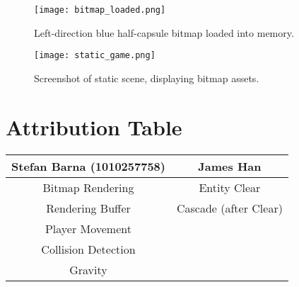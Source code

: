 \documentclass{article}
\begin{document}
\begin{figure}
    \centering
    \texttt{[image: bitmap\_loaded.png]}
    \caption{Left-direction blue half-capsule bitmap loaded into memory.}
    \label{fig:bitmap-loaded}
\end{figure}

\begin{figure}[ht!]
    \centering
    \texttt{[image: static\_game.png]}
    \caption{Screenshot of static scene, displaying bitmap assets.}
    \label{fig:static-game}
\end{figure}

\section{Attribution Table}
\begin{center}
\begin{tabular}{|| c | c ||}
\hline
Stefan Barna (1010257758) & James Han \\
\hline
\hline
Bitmap Rendering & Entity Clear \\
\hline
Rendering Buffer & Cascade (after Clear) \\
\hline
Player Movement & \\
\hline
Collision Detection & \\
\hline
Gravity & \\
\hline
\end{tabular}
\end{center}
\end{document}
